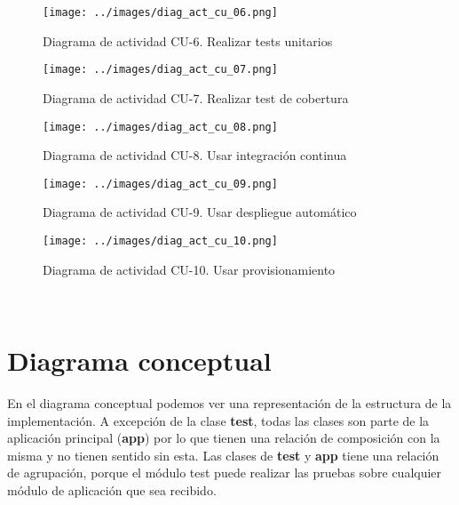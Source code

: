 \begin{figure}[!ht]
  \begin{center}
  \texttt{[image: ../images/diag\_act\_cu\_06.png]}
  \caption{Diagrama de actividad CU-6. Realizar tests unitarios}
  \label{fig:diag_act_cu_06}
  \end{center}
\end{figure}

\begin{figure}[!ht]
  \begin{center}
  \texttt{[image: ../images/diag\_act\_cu\_07.png]}
  \caption{Diagrama de actividad CU-7. Realizar test de cobertura}
  \label{fig:diag_act_cu_07}
  \end{center}
\end{figure}

\begin{figure}[!ht]
  \begin{center}
  \texttt{[image: ../images/diag\_act\_cu\_08.png]}
  \caption{Diagrama de actividad CU-8. Usar integración continua}
  \label{fig:diag_act_cu_08}
  \end{center}
\end{figure}

\begin{figure}[!ht]
  \begin{center}
  \texttt{[image: ../images/diag\_act\_cu\_09.png]}
  \caption{Diagrama de actividad CU-9. Usar despliegue automático}
  \label{fig:diag_act_cu_09}
  \end{center}
\end{figure}

\begin{figure}[!ht]
  \begin{center}
  \texttt{[image: ../images/diag\_act\_cu\_10.png]}
  \caption{Diagrama de actividad CU-10. Usar provisionamiento}
  \label{fig:diag_act_cu_10}
  \end{center}
\end{figure}

\newpage
\
\newpage
\
\newpage
\
\newpage
\
\newpage
\
\newpage
\
\newpage
\
\newpage
\
\newpage

\section{Diagrama conceptual}

En el diagrama conceptual podemos ver una representación de la estructura de la implementación. A excepción de la clase \textbf{test}, todas las clases son parte de la aplicación principal (\textbf{app}) por lo que tienen una relación de composición con la misma y no tienen sentido sin esta. Las clases de \textbf{test} y \textbf{app} tiene una relación de agrupación, porque el módulo test puede realizar las pruebas sobre cualquier módulo de aplicación que sea recibido.

